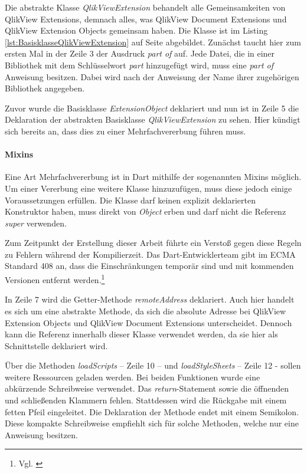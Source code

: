 Die abstrakte Klasse \textit{QlikViewExtension} behandelt alle Gemeinsam\-keiten von QlikView Extensions, demnach alles, was QlikView Document Extensions und QlikView Extension Objects gemeinsam haben. Die Klasse ist im Listing \ref{lst:BasisklasseQlikViewExtension} auf Seite \pageref{lst:BasisklasseQlikViewExtension} abgebildet. Zunächst taucht hier zum ersten Mal in der Zeile 3 der Ausdruck \textit{part of} auf. Jede Datei, die in einer Bibliothek mit dem Schlüssel\-wort \textit{part} hinzugefügt wird, muss eine \textit{part of} Anweisung besitzen. Dabei wird nach der Anweisung der Name ihrer zugehörigen Bibliothek angegeben.

Zuvor wurde die Basisklasse \textit{ExtensionObject} deklariert und nun ist in Zeile 5 die Deklaration der abstrakten Basisklasse \textit{QlikViewExtension} zu sehen. Hier kündigt sich bereits an, dass dies zu einer Mehrfachvererbung führen muss.

\paragraph{Mixins}
Eine Art Mehrfachvererbung ist in Dart mithilfe der sogenannten Mixins möglich. Um einer Vererbung eine weitere Klasse hinzuzufügen, muss diese jedoch einige Voraussetzungen erfüllen. Die Klasse darf keinen explizit deklarierten Konstruktor haben, muss direkt von \textit{Object} erben und darf nicht die Referenz \textit{super} verwenden. 

\newpage

Zum Zeitpunkt der Erstellung dieser Arbeit führte ein Verstoß gegen diese Regeln zu Fehlern während der Kompilierzeit. Das Dart-Entwicklerteam gibt im ECMA Standard 408 an, dass die Einschränkungen temporär sind und mit kommenden Versionen entfernt werden.\footnote{Vgl. \cite[S. 41]{EcmaDartProgrammingLanguageSpecificationSecondEdition}}

In Zeile 7 wird die Getter-Methode \textit{remoteAddress} deklariert. Auch hier handelt es sich um eine abstrakte Methode, da sich die absolute Adresse bei QlikView Extension Objects und QlikView Document Extensions unterscheidet. Dennoch kann die Referenz innerhalb dieser Klasse verwendet werden, da sie hier als Schnittstelle deklariert wird.

Über die Methoden \textit{loadScripts} – Zeile 10 – und \textit{loadStyleSheets} – Zeile 12 - sollen weitere Ressourcen geladen werden. Bei beiden Funktionen wurde eine abkürzende Schreibweise verwendet. Das \textit{return}-Statement sowie die öffnenden und schließenden Klammern fehlen. Stattdessen wird die Rückgabe mit einem fetten Pfeil eingeleitet. Die Deklaration der Methode endet mit einem Semikolon. Diese kompakte Schreibweise empfiehlt sich für solche Methoden, welche nur eine Anweisung besitzen. 

